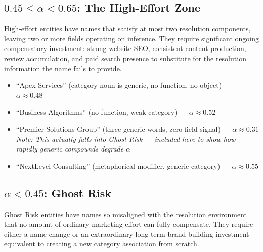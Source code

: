 \documentclass[12pt, openany]{book}
\theoremstyle{thmstyle}
\theoremstyle{defstyle}
\begin{document}
\subsection{$0.45 \leq \alpha < 0.65$: The High-Effort Zone}

High-effort entities have names that satisfy at most two resolution components, leaving two or more fields operating on inference. They require significant ongoing compensatory investment: strong website SEO, consistent content production, review accumulation, and paid search presence to substitute for the resolution information the name fails to provide.

\begin{examplebox}
\begin{itemize}[leftmargin=1.5em]
  \item ``Apex Services'' (category noun is generic, no function, no object) --- $\alpha \approx 0.48$
  \item ``Business Algorithms'' (no function, weak category) --- $\alpha \approx 0.52$
  \item ``Premier Solutions Group'' (three generic words, zero field signal) --- $\alpha \approx 0.31$ \\
    \textit{Note: This actually falls into Ghost Risk --- included here to show how rapidly generic compounds degrade $\alpha$}
  \item ``NextLevel Consulting'' (metaphorical modifier, generic category) --- $\alpha \approx 0.55$
\end{itemize}
\end{examplebox}

\subsection{$\alpha < 0.45$: Ghost Risk}

Ghost Risk entities have names so misaligned with the resolution environment that no amount of ordinary marketing effort can fully compensate. They require either a name change or an extraordinary long-term brand-building investment equivalent to creating a new category association from scratch.
\end{document}
